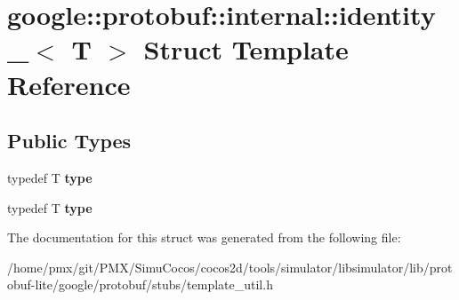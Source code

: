 \hypertarget{structgoogle_1_1protobuf_1_1internal_1_1identity__}{}\section{google\+:\+:protobuf\+:\+:internal\+:\+:identity\+\_\+$<$ T $>$ Struct Template Reference}
\label{structgoogle_1_1protobuf_1_1internal_1_1identity__}
\subsection*{Public Types}
\begin{DoxyCompactItemize}
\item 
\mbox{\label{structgoogle_1_1protobuf_1_1internal_1_1identity___a249cbb7bddf305ef2d87f1b6b679818b}} 
typedef T {\bfseries type}
\item 
\mbox{\label{structgoogle_1_1protobuf_1_1internal_1_1identity___a249cbb7bddf305ef2d87f1b6b679818b}} 
typedef T {\bfseries type}
\end{DoxyCompactItemize}


The documentation for this struct was generated from the following file\+:\begin{DoxyCompactItemize}
\item 
/home/pmx/git/\+P\+M\+X/\+Simu\+Cocos/cocos2d/tools/simulator/libsimulator/lib/protobuf-\/lite/google/protobuf/stubs/template\+\_\+util.\+h\end{DoxyCompactItemize}
